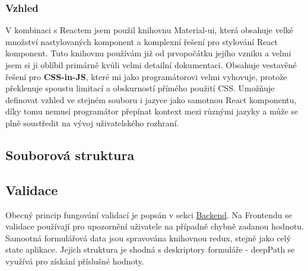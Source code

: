 \subsubsection{Vzhled}
V kombinaci s Reactem jsem použil knihovnu Material-ui, která obsahuje velké množství nastylovaných komponent a komplexní řešení pro stylování React komponent. Tuto knihovnu používám již od prvopočátku jejího vzniku a velmi jsem si ji oblíbil primárně kvůli velmi detailní dokumentaci. Obsahuje vestavěné řešení pro \textbf{CSS-in-JS}, které mi jako programátorovi velmi vyhovuje, protože překlenuje spoustu limitací a obskurností přímého použití CSS. Umožňuje definovat vzhled ve stejném souboru i jazyce jako samotnou React komponentu, díky tomu nemusí programátor přepínat kontext mezi různými jazyky a může se plně soustředit na vývoj uživatelského rozhraní.

\subsection{Souborová struktura}

\subsection{Validace}
Obecný princip fungování validací je popsán v sekci \hyperref[BE:Validace]{Backend}. Na Frontendu se validace používají pro upozornění uživatele na případně chybně zadanou hodnotu. Samootná formulářová data jsou spravována knihovnou redux, stejně jako celý state aplikace. Jejich struktura je shodná s deskriptory formuláře - deepPath se využívá pro získání příslušné hodnoty.

